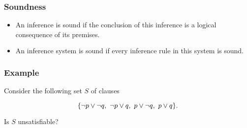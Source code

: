 
	   \begin{frame}\frametitle{Soundness}

\begin{itemize}
\item
  \alert{An inference is sound} if 
  the conclusion of this inference is a logical 
  consequence of its premises.

\item
  \alert{An inference system
  is sound} if every inference rule in this system is sound.
\end{itemize}

\bigskip



                           \end{frame}


	   \begin{frame}\frametitle{Example}

Consider the following set $S$ of clauses

    \[{
      {\{\neg p \vee \neg q,~\neg p \vee q,~p \vee \neg q,~p \vee q\}}.
    }\]


  Is $S$ unsatisfiable?

  \bigskip


                           \end{frame}



